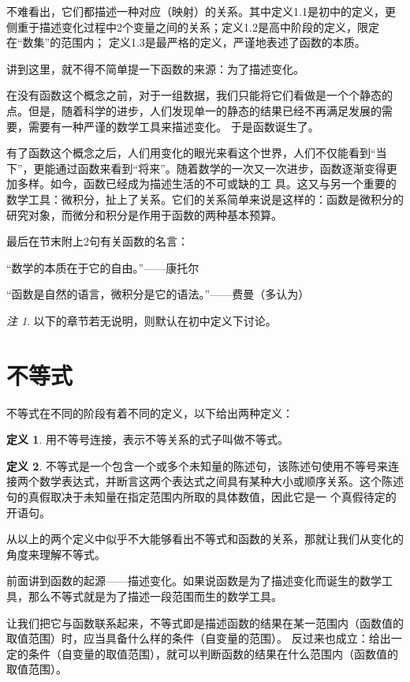 \documentclass[a4paper,12pt]{ctexbook}
\theoremstyle{definition}
\newtheorem{definition}{定义}[chapter]
\theoremstyle{plain}
\theoremstyle{remark}
\newtheorem*{remark}{注}
\begin{document}
不难看出，它们都描述一种对应（映射）的关系。其中定义1.1是初中的定义，更侧重于描述变化过程中2个变量之间的关系；定义1.2是高中阶段的定义，限定在“数集”的范围内；
定义1.3是最严格的定义，严谨地表述了函数的本质。

讲到这里，就不得不简单提一下函数的来源：为了描述变化。

在没有函数这个概念之前，对于一组数据，我们只能将它们看做是一个个静态的点。但是，随着科学的进步，人们发现单一的静态的结果已经不再满足发展的需要，需要有一种严谨的数学工具来描述变化。
于是函数诞生了。

有了函数这个概念之后，人们用变化的眼光来看这个世界，人们不仅能看到“当下”，更能通过函数来看到“将来”。随着数学的一次又一次进步，函数逐渐变得更加多样。如今，函数已经成为描述生活的不可或缺的工
具。这又与另一个重要的数学工具：微积分，扯上了关系。它们的关系简单来说是这样的：函数是微积分的研究对象，而微分和积分是作用于函数的两种基本预算。

最后在节末附上2句有关函数的名言：

“数学的本质在于它的自由。”——康托尔

“函数是自然的语言，微积分是它的语法。”——费曼（多认为）

\begin{remark}
以下的章节若无说明，则默认在初中定义下讨论。
\end{remark}

\section{不等式}

不等式在不同的阶段有着不同的定义，以下给出两种定义：

\begin{definition}
用不等号连接，表示不等关系的式子叫做不等式。
\end{definition}

\begin{definition}
不等式是一个包含一个或多个未知量的陈述句，该陈述句使用不等号来连接两个数学表达式，并断言这两个表达式之间具有某种大小或顺序关系。这个陈述句的真假取决于未知量在指定范围内所取的具体数值，因此它是一
个真假待定的开语句。
\end{definition}

从以上的两个定义中似乎不大能够看出不等式和函数的关系，那就让我们从变化的角度来理解不等式。

前面讲到函数的起源——描述变化。如果说函数是为了描述变化而诞生的数学工具，那么不等式就是为了描述一段范围而生的数学工具。

让我们把它与函数联系起来，不等式即是描述函数的结果在某一范围内（函数值的取值范围）时，应当具备什么样的条件（自变量的范围）。
反过来也成立：给出一定的条件（自变量的取值范围），就可以判断函数的结果在什么范围内（函数值的取值范围）。
\end{document}
